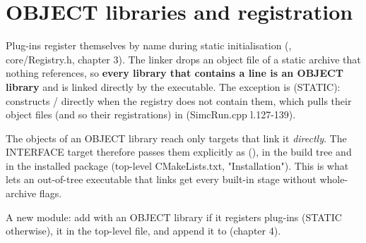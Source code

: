 \section{\texorpdfstring{OBJECT libraries and registration}{OBJECT libraries and registration}}\label{developer_manual-02u5fbuild:23-object-libraries-and-registration}
Plug-ins register themselves by name during static initialisation (, core/\allowbreak{}Registry.\allowbreak{}h,\allowbreak{} chapter 3). The
linker drops an object file of a static archive that nothing references, so \textbf{every library that contains a
 line is an OBJECT library} and is linked directly by the executable. The exception is
 (STATIC):  constructs  /  directly when the registry
does not contain them, which pulls their object files (and so their registrations) in (SimcRun.\allowbreak{}cpp l.127-139).

The objects of an OBJECT library reach only targets that link it \emph{directly}. The INTERFACE target  therefore
passes them explicitly as  (), in the build tree and in the installed package
(top-level CMakeLists.\allowbreak{}txt,\allowbreak{} "Installation"). This is what lets an out-of-tree executable that links  get
every built-in stage without whole-archive flags.

A new module: add  with an OBJECT library if it registers plug-ins (STATIC otherwise),
 it in the top-level file, and append it to  (chapter 4).

